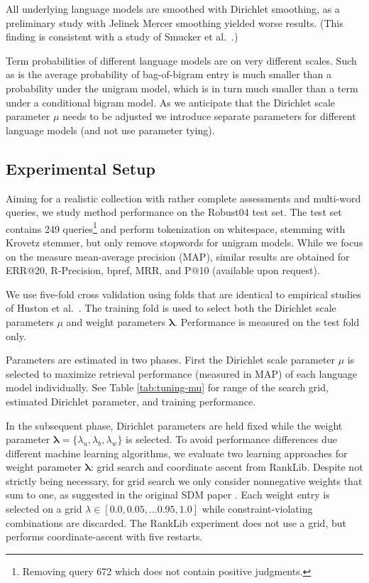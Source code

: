 \documentclass[]{article}
\begin{document}
All underlying language models are smoothed with Dirichlet smoothing,
as a preliminary study with Jelinek Mercer smoothing yielded worse
results. (This finding is consistent with a study of Smucker et al.~\cite{smucker2006smoothing}.)

Term probabilities of different language models are on very different
scales. Such as is the average probability of bag-of-bigram entry
is much smaller than a probability under the unigram model, which
is in turn much smaller than a term under a conditional bigram model.
As we anticipate that the Dirichlet scale parameter $\mu$ needs to be
adjusted we introduce separate parameters for different
language models (and not use parameter tying).

\subsection{Experimental Setup}

Aiming for a realistic collection with rather complete assessments
and multi-word queries, we study method performance on the Robust04
test set. The test set contains 249 queries\footnote{Removing query 672 which does not contain positive judgments. }
and perform tokenization on whitespace, stemming with Krovetz stemmer,
but only remove stopwords for unigram models. While we focus on the measure mean-average
precision (MAP), similar results are obtained for ERR@20, R-Precision,
bpref, MRR, and P@10 (available upon request).

We use five-fold cross validation using folds that are identical to
empirical studies of Huston et al.~\cite{huston2013termdependencies,huston2014termdepedencies-appendix}.
The training fold is used to select both the Dirichlet scale parameters
$\mu$ and weight parameters $\boldsymbol{\lambda}$. Performance
is measured on the test fold only.

Parameters are estimated in two phases. First the Dirichlet scale
parameter $\mu$ is selected to maximize retrieval performance (measured
in MAP) of each language model individually. See Table \ref{tab:tuning-mu}
for range of the search grid, estimated Dirichlet parameter,
and training performance.

In the subsequent phase, Dirichlet parameters are held fixed while
the weight parameter $\boldsymbol{\lambda}=\{\lambda_{u},\lambda_{b},\lambda_{w}\}$
is selected. To avoid performance differences due different machine
learning algorithms, we evaluate two learning approaches for weight
parameter $\boldsymbol{\lambda}$: grid search and coordinate ascent
from RankLib. Despite not strictly being necessary, for grid search we only consider nonnegative weights
that sum to one, as suggested in the original SDM paper \cite{metzler2005sdm}. Each weight entry is selected on
a grid $\lambda\in[0.0,0.05,\ldots0.95,1.0]$ while constraint-violating
combinations are discarded. The RankLib experiment does not use a
grid, but performs coordinate-ascent with five restarts.
\end{document}
